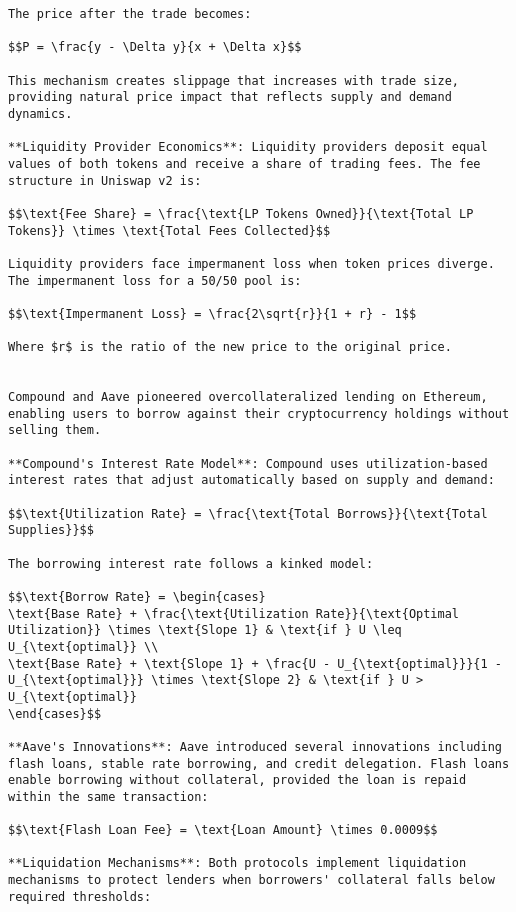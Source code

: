 \documentclass[12pt]{article}
\begin{document}
{{{\begin{itemize}
\begin{lstlisting}
The price after the trade becomes:

$$P = \frac{y - \Delta y}{x + \Delta x}$$

This mechanism creates slippage that increases with trade size, providing natural price impact that reflects supply and demand dynamics.

**Liquidity Provider Economics**: Liquidity providers deposit equal values of both tokens and receive a share of trading fees. The fee structure in Uniswap v2 is:

$$\text{Fee Share} = \frac{\text{LP Tokens Owned}}{\text{Total LP Tokens}} \times \text{Total Fees Collected}$$

Liquidity providers face impermanent loss when token prices diverge. The impermanent loss for a 50/50 pool is:

$$\text{Impermanent Loss} = \frac{2\sqrt{r}}{1 + r} - 1$$

Where $r$ is the ratio of the new price to the original price.


Compound and Aave pioneered overcollateralized lending on Ethereum, enabling users to borrow against their cryptocurrency holdings without selling them.

**Compound's Interest Rate Model**: Compound uses utilization-based interest rates that adjust automatically based on supply and demand:

$$\text{Utilization Rate} = \frac{\text{Total Borrows}}{\text{Total Supplies}}$$

The borrowing interest rate follows a kinked model:

$$\text{Borrow Rate} = \begin{cases}
\text{Base Rate} + \frac{\text{Utilization Rate}}{\text{Optimal Utilization}} \times \text{Slope 1} & \text{if } U \leq U_{\text{optimal}} \\
\text{Base Rate} + \text{Slope 1} + \frac{U - U_{\text{optimal}}}{1 - U_{\text{optimal}}} \times \text{Slope 2} & \text{if } U > U_{\text{optimal}}
\end{cases}$$

**Aave's Innovations**: Aave introduced several innovations including flash loans, stable rate borrowing, and credit delegation. Flash loans enable borrowing without collateral, provided the loan is repaid within the same transaction:

$$\text{Flash Loan Fee} = \text{Loan Amount} \times 0.0009$$

**Liquidation Mechanisms**: Both protocols implement liquidation mechanisms to protect lenders when borrowers' collateral falls below required thresholds:


\end{lstlisting}
\end{itemize}}}}
\end{document}
